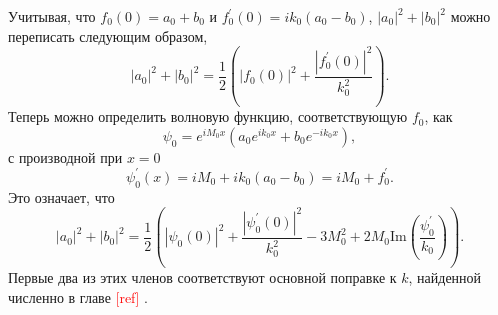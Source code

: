 \documentclass[A4,12pt,oneside]{article}
\renewcommand{\(}{\left(}
\renewcommand{\)}{\right)}
\newcommand{\citeph}{\textcolor{red}{[ref] }}
\renewcommand{\Im}{\mathrm{Im}}
\begin{document}
Учитывая, что $f_0\left(0\right) = a_0 + b_0$ и $f^\prime_0\left(0\right) = ik_0 \left(a_0-b_0\right)$, $\left|a_0\right|^2+\left|b_0\right|^2$ можно переписать следующим образом,
\begin{equation}
\left|a_0\right|^2 +\left|b_0\right|^2 = \frac{1}{2}\left(
\left|f_0\left(0\right)\right|^2 + \frac{\left|f^\prime_0\left(0\right)\right|^2}{k^2_0}
\right).
\end{equation} 
Теперь можно определить волновую функцию, соответствующую $f_0$, как
\begin{equation}
\psi_0 = e^{i M_0 x} \left( a_0 e^{i k_0 x} + b_0 e^{- i k_0 x} \right),
\end{equation}
с производной при $x = 0$
\begin{equation}
\psi_0^\prime\left(x\right) = i M_0 + i k_0 \left( a_0 - b_0 \right) = i M_0 + f_0^\prime.
\end{equation}
Это означает, что
\begin{equation}
\left|a_0\right|^2 +\left|b_0\right|^2 = \frac{1}{2}\left(
\left|\psi_0\left(0\right)\right|^2 + \frac{\left|\psi^\prime_0\left(0\right)\right|^2}{k^2_0} - 3M_0^2 + 2 M_0 \Im \left(\frac{\psi^\prime_0}{k_0}\right)
\right).
\end{equation} 
Первые два из этих членов соответствуют основной поправке к $k$, найденной численно в главе \citeph .
\end{document}
